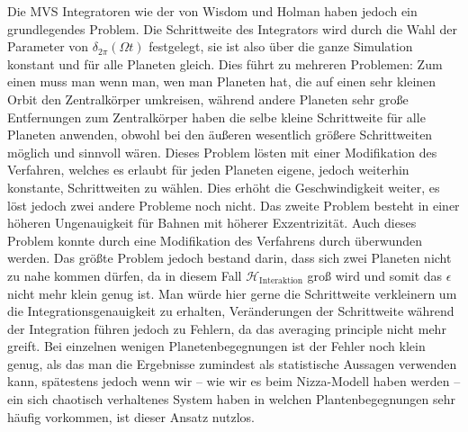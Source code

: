 \documentclass[12pt,a4paper,twoside]{article}
\renewcommand{\cite}{\citep}
\renewcommand{\H}{\mathcal H}
\begin{document}
Die MVS Integratoren wie der von Wisdom und Holman haben jedoch ein grundlegendes Problem. Die Schrittweite des Integrators wird durch die Wahl der Parameter von $\delta_{2\pi}(\Omega t)$ festgelegt, sie ist also über die ganze Simulation konstant und für alle Planeten gleich.
Dies führt zu mehreren Problemen: Zum einen muss man wenn man, wen man Planeten hat, die auf einen sehr kleinen Orbit den Zentralkörper umkreisen, während andere Planeten sehr große Entfernungen zum Zentralkörper haben die selbe kleine Schrittweite für alle Planeten anwenden, obwohl bei den äußeren wesentlich größere Schrittweiten möglich und sinnvoll wären. Dieses Problem lösten \cite{Saha1994} mit einer Modifikation des Verfahren, welches es erlaubt für jeden Planeten eigene, jedoch weiterhin konstante, Schrittweiten zu wählen.
Dies erhöht die Geschwindigkeit weiter, es löst jedoch zwei andere Probleme noch nicht. Das zweite Problem besteht in einer höheren Ungenauigkeit für Bahnen mit höherer Exzentrizität. Auch dieses Problem konnte durch eine Modifikation des Verfahrens durch \cite{Mikkola1997} überwunden werden.
Das größte Problem jedoch bestand darin, dass sich zwei Planeten nicht zu nahe kommen dürfen, da in diesem Fall $\H_{\mathrm{Interaktion}}$ groß wird und somit das $\epsilon$ nicht mehr klein genug ist. Man würde hier gerne die Schrittweite verkleinern um die Integrationsgenauigkeit zu erhalten, Veränderungen der Schrittweite während der Integration führen jedoch zu Fehlern, da das averaging principle nicht mehr greift.
Bei einzelnen wenigen Planetenbegegnungen ist der Fehler noch klein genug, als das man die Ergebnisse zumindest als statistische Aussagen verwenden kann\cite{Chambers1999},
 spätestens jedoch wenn wir – wie wir es beim Nizza-Modell haben werden – ein sich chaotisch verhaltenes System haben in welchen Plantenbegegnungen sehr häufig vorkommen, ist dieser Ansatz nutzlos.
\end{document}
